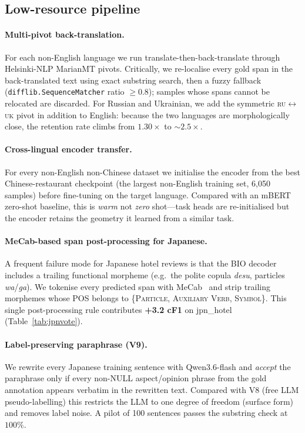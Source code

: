 \documentclass[runningheads]{llncs}
\begin{document}
\subsection{Low-resource pipeline}
\label{sec:method:lowres}

\paragraph{Multi-pivot back-translation.}
For each non-English language we run translate-then-back-translate
through Helsinki-NLP MarianMT pivots. Critically, we re-localise every
gold span in the back-translated text using exact substring search,
then a fuzzy fallback (\texttt{difflib.SequenceMatcher} ratio
$\geq 0.8$); samples whose spans cannot be relocated are discarded.
For Russian and Ukrainian, we add the symmetric \textsc{ru$\leftrightarrow$uk}
pivot in addition to English: because the two languages are
morphologically close, the retention rate climbs from
$1.30\times$ to $\sim$$2.5\times$.

\paragraph{Cross-lingual encoder transfer.}
For every non-English non-Chinese dataset we initialise the encoder
from the best Chinese-restaurant checkpoint (the largest non-English
training set, 6{,}050 samples) before fine-tuning on the target
language. Compared with an mBERT zero-shot baseline, this is
\emph{warm} not \emph{zero} shot---task heads are re-initialised but
the encoder retains the geometry it learned from a similar task.

\paragraph{MeCab-based span post-processing for Japanese.}
A frequent failure mode for Japanese hotel reviews is that the BIO
decoder includes a trailing functional morpheme (e.g.\ the polite
copula \emph{desu}, particles \emph{wa}/\emph{ga}). We tokenise every
predicted span with MeCab~\cite{kudo2004mecab} and strip trailing
morphemes whose POS belongs to
\{\textsc{Particle}, \textsc{Auxiliary Verb}, \textsc{Symbol}\}.
This single post-processing rule contributes
\textbf{+3.2 cF1} on jpn\_hotel (Table~\ref{tab:jpnvote}).

\paragraph{Label-preserving paraphrase (V9).}
We rewrite every Japanese training sentence with Qwen3.6-flash and
\emph{accept} the paraphrase only if every non-NULL aspect/opinion
phrase from the gold annotation appears verbatim in the rewritten
text. Compared with V8 (free LLM pseudo-labelling) this restricts the
LLM to one degree of freedom (surface form) and removes label noise.
A pilot of 100 sentences passes the substring check at $100\%$.
\end{document}
